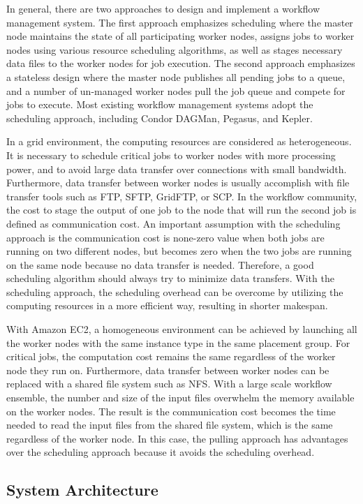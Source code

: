 In general, there are two approaches to design and implement a workflow management system. The first approach emphasizes scheduling where the master node maintains the state of all participating worker nodes, assigns jobs to worker nodes using various resource scheduling algorithms, as well as stages necessary data files to the worker nodes for job execution. The second approach emphasizes a stateless design where the master node publishes all pending jobs to a queue, and a number of un-managed worker nodes pull the job queue and compete for jobs to execute. Most existing workflow management systems adopt the scheduling approach, including Condor DAGMan, Pegasus, and Kepler. 

In a grid environment, the computing resources are considered as heterogeneous. It is necessary to schedule critical jobs to worker nodes with more processing power, and to avoid large data transfer over connections with small bandwidth. Furthermore, data transfer between worker nodes is usually accomplish with file transfer tools such as FTP, SFTP, GridFTP, or SCP. In the workflow community, the cost to stage the output of one job to the node that will run the second job is defined as communication cost. An important assumption with the scheduling approach is the communication cost is none-zero value when both jobs are running on two different nodes, but becomes zero when the two jobs are running on the same node because no data transfer is needed. Therefore, a good scheduling algorithm should always try to minimize data transfers. With the scheduling approach, the scheduling overhead can be overcome by utilizing the computing resources in a more efficient way, resulting in shorter makespan. 

With Amazon EC2, a homogeneous environment can be achieved by launching all the worker nodes with the same instance type in the same placement group. For critical jobs, the computation cost remains the same regardless of the worker node they run on. Furthermore, data transfer between worker nodes can be replaced with a shared file system such as NFS. With a large scale workflow ensemble, the number and size of the input files overwhelm the memory available on the worker nodes. The result is the communication cost becomes the time needed to read the input files from the shared file system, which is the same regardless of the worker node. In this case, the pulling approach has advantages over the scheduling approach because it avoids the scheduling overhead.


\subsection{System Architecture}
\label{sec:subsec:system_architecture}

